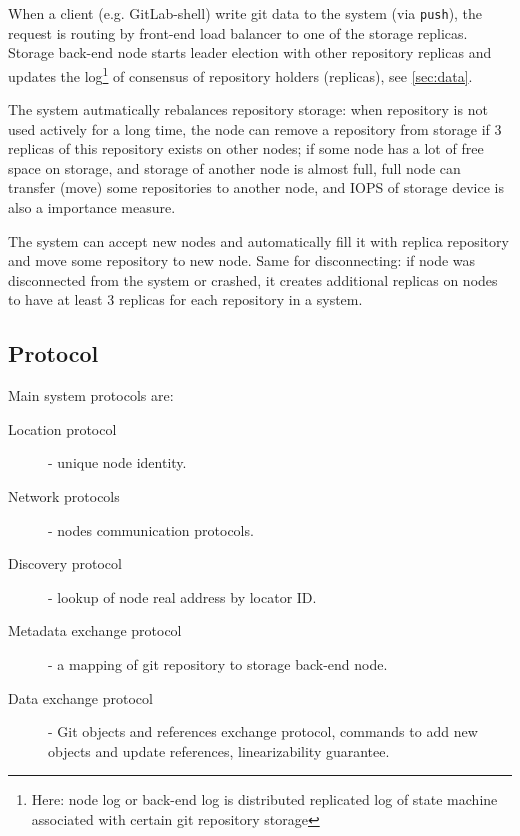 \documentclass[12pt,oneside]{article}
\newcommand{\code}[1]{\texttt{#1}}
\begin{document}
When a client (e.g. GitLab-shell) write git data to the system (via \code{push}), the request is routing
by front-end load balancer to one of the storage replicas.
Storage back-end node starts leader election with other repository replicas and updates the log\footnote{Here: node log
or back-end log is distributed replicated log of state machine associated with certain git repository storage}
of consensus of repository holders (replicas), see \ref{sec:data}.

The system autmatically rebalances repository storage: when repository is not used actively for a
long time, the node can remove a repository from storage if 3 replicas of this repository exists on other nodes;
if some node has a lot of free space on storage, and storage of another node is almost full,
full node can transfer (move) some repositories to another node, and IOPS of storage device is also
a importance measure.

The system can accept new nodes and automatically fill it with replica repository and
move some repository to new node. Same for disconnecting: if node was disconnected from the system or crashed,
it creates additional replicas on nodes to have at least 3 replicas for each repository in a system.

\subsection{Protocol}
Main system protocols are:
\begin{description}
  \item[Location protocol] - unique node identity.
  \item[Network protocols] - nodes communication protocols.
  \item[Discovery protocol] - lookup of node real address by locator ID.
  \item[Metadata exchange protocol] - a mapping of git repository to storage back-end node.
  \item[Data exchange protocol] - Git objects and references exchange protocol,
    commands to add new objects and update references, linearizability guarantee.
\end{description}
\end{document}
